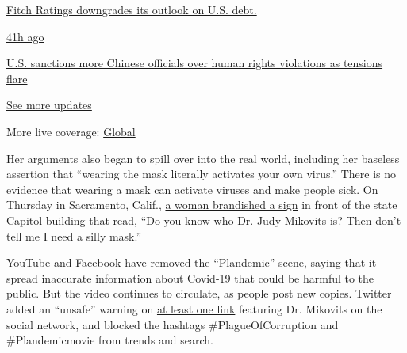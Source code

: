 \href{https://www.nytimes3xbfgragh.onion/live/2020/07/31/business/stock-market-today-coronavirus?action=click\&pgtype=Article\&state=default\&region=MAIN_CONTENT_1\&context=storylines_live_updates\#fitch-ratings-downgrades-its-outlook-on-us-debt}{Fitch
Ratings downgrades its outlook on U.S. debt.}

\href{https://www.nytimes3xbfgragh.onion/live/2020/07/31/business/stock-market-today-coronavirus?action=click\&pgtype=Article\&state=default\&region=MAIN_CONTENT_1\&context=storylines_live_updates\#us-sanctions-more-chinese-officials-over-human-rights-violations-as-tensions-flare}{41h
ago}

\href{https://www.nytimes3xbfgragh.onion/live/2020/07/31/business/stock-market-today-coronavirus?action=click\&pgtype=Article\&state=default\&region=MAIN_CONTENT_1\&context=storylines_live_updates\#us-sanctions-more-chinese-officials-over-human-rights-violations-as-tensions-flare}{U.S.
sanctions more Chinese officials over human rights violations as
tensions flare}

\href{https://www.nytimes3xbfgragh.onion/live/2020/07/31/business/stock-market-today-coronavirus?action=click\&pgtype=Article\&state=default\&region=MAIN_CONTENT_1\&context=storylines_live_updates}{See
more updates}

More live coverage:
\href{https://www.nytimes3xbfgragh.onion/2020/08/01/world/coronavirus-covid-19.html?action=click\&pgtype=Article\&state=default\&region=MAIN_CONTENT_1\&context=storylines_live_updates}{Global}

Her arguments also began to spill over into the real world, including
her baseless assertion that ``wearing the mask literally activates your
own virus.'' There is no evidence that wearing a mask can activate
viruses and make people sick. On Thursday in Sacramento, Calif.,
\href{https://twitter.com/mikeblountsac/status/1258439584507031552}{a
woman brandished a sign} in front of the state Capitol building that
read, ``Do you know who Dr. Judy Mikovits is? Then don't tell me I need
a silly mask.''

YouTube and Facebook have removed the ``Plandemic'' scene, saying that
it spread inaccurate information about Covid-19 that could be harmful to
the public. But the video continues to circulate, as people post new
copies. Twitter added an ``unsafe'' warning on
\href{https://twitter.com/DrJudyAMikovits/status/1257425999408611330}{at
least one link} featuring Dr. Mikovits on the social network, and
blocked the hashtags \#PlagueOfCorruption and \#Plandemicmovie from
trends and search.


